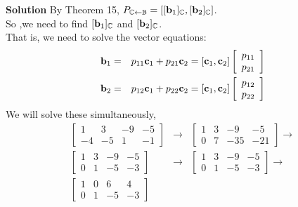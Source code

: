  \begin{frame}[fragile]

\textbf{Solution}
By Theorem 15, $ P_{\mathbb C\leftarrow\mathbb B} = [ [\textbf b_1]_{\mathbb C}, [\textbf b_2]_{\mathbb C} ]$.   \\ 
So ,we need to find $ [\textbf b_1]_{\mathbb C}$ and $[\textbf b_2]_{\mathbb C}$.    \\ 
That is, we need to solve the vector equations:
\begin{eqnarray*}
\textbf b_1 &=& p_{11} \textbf c_1 + p_{21}\textbf c_2 =  \left[ \textbf c_1, \textbf c_2\right] \left[\begin{array}{r} p_{11} \\ p_{21}\end{array}\right] \\ 
 \textbf b_2 &=& p_{12} \textbf c_1 + p_{22}\textbf c_2 =  \left[ \textbf c_1, \textbf c_2\right] \left[\begin{array}{r} p_{12} \\ p_{22}\end{array}\right] 
\end{eqnarray*} 
We will solve these simultaneously,  
\begin{eqnarray*}
\left[\begin{array}{rrrr} 1 & 3 & -9 & -5 \\ -4 & -5& 1& -1 \end{array}\right] &\rightarrow&
\left[\begin{array}{rrrr} 1 & 3 & -9 & -5 \\ 0 & 7& -35& -21 \end{array} \right]\rightarrow \\
\left[\begin{array}{rrrr} 1 & 3 & -9 & -5 \\ 0 & 1& -5& -3 \end{array}\right] &\rightarrow&
\left[\begin{array}{rrrr} 1 & 3 & -9 & -5 \\ 0 & 1& -5& -3 \end{array}\right] \rightarrow  \\
\left[\begin{array}{rrrr} 1 & 0 & 6 & 4 \\ 0 & 1& -5& -3 \end{array}\right] 
\end{eqnarray*}

\end{frame}





